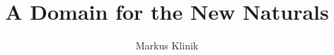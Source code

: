 \documentclass[a4paper]{article}
\begin{document}
\title{A Domain for the New Naturals}
\author{Markus Klinik}
\maketitle


\cite{Pierce1991} \cite{Gunter1992} \cite{Bird1997} \cite{Mitchell1996}
\cite{Allison1986} \cite{Capretta2002}



\end{document}

